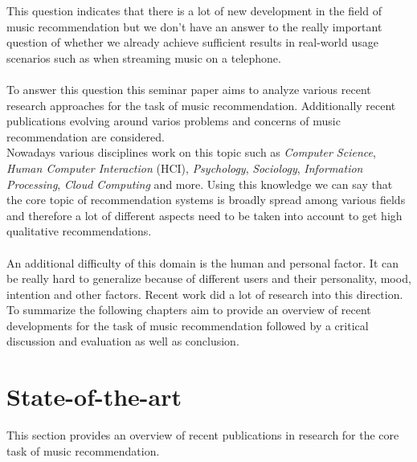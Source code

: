 \documentclass[runningheads,a4paper]{llncs}
\begin{document}
This question indicates that there is a lot of new development in the field of music recommendation but we don't have an answer to the really important question of whether we already achieve 
sufficient results in real-world usage scenarios such as when streaming music on a telephone.\\
\\
To answer this question this seminar paper aims to analyze various recent research approaches for the task of music recommendation. Additionally recent publications evolving around varios problems and concerns of music recommendation are considered.\\
Nowadays various disciplines work on this topic such as \textit{Computer Science}, \textit{Human Computer Interaction} (HCI), 
\textit{Psychology}, \textit{Sociology}, \textit{Information Processing}, \textit{Cloud Computing} and more. 
Using this knowledge we can say that the core topic of recommendation systems is broadly spread among various fields and therefore 
a lot of different aspects need to be taken into account to get high qualitative recommendations. \\
\\
An additional difficulty of this domain is the human and personal factor. It can be really hard to generalize because of 
different users and their personality, mood, intention and other factors. Recent work did a lot of research into this direction.\\
To summarize the following chapters aim to provide an overview of recent developments for the task of music recommendation 
followed by a critical discussion and evaluation as well as conclusion. 
\section{State-of-the-art}
This section provides an overview of recent publications in research for the core task of music recommendation. 
\end{document}
